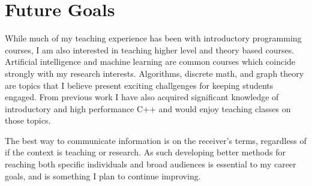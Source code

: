 \documentclass[a4paper, 11pt]{article}
\begin{document}
\section{Future Goals}
While much of my teaching experience has been with introductory
programming courses, I am also interested in teaching higher level
and theory based courses. Artificial intelligence and machine learning
are common courses which coincide strongly with my research interests.
Algorithms, discrete math, and graph theory are topics that I believe
present exciting challgenges for keeping students engaged.
From previous work I have also acquired significant knowledge of
introductory and high performance C++ and would enjoy teaching classes
on those topics.

The best way to communicate information is on the receiver's
terms, regardless of if the context is teaching or research.
As such developing better methods for reaching both specific
individuals and broad audiences is essential to my career goals,
and is something I plan to continue improving.
\end{document}
